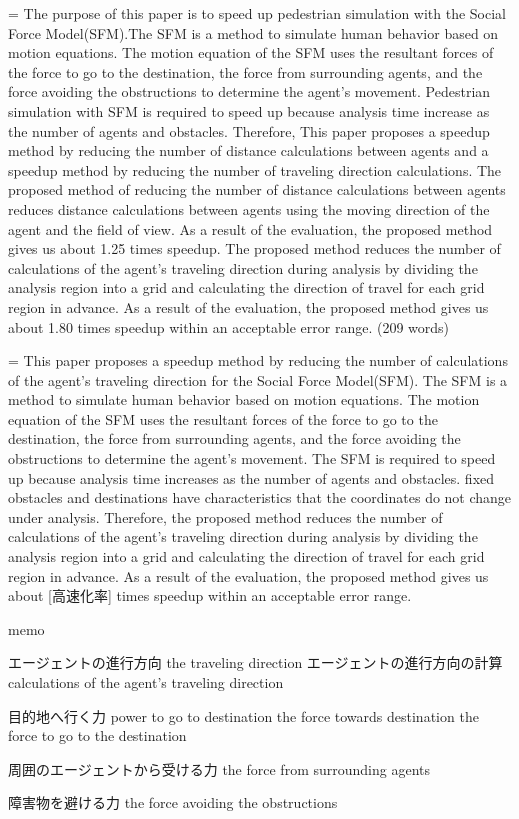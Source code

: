 ={
The purpose of this paper is to speed up pedestrian simulation with the Social Force Model(SFM).The SFM is a method to simulate human behavior based on motion equations. The motion equation of the SFM uses the resultant forces of the force to go to the destination, the force from surrounding agents, and the force avoiding the obstructions to determine the agent’s movement. Pedestrian simulation with SFM is required to speed up because analysis time increase as the number of agents and obstacles. Therefore, This paper proposes a speedup method by reducing the number of distance calculations between agents and a speedup method by reducing the number of traveling direction calculations. The proposed method of reducing the number of distance calculations between agents reduces distance calculations between agents using the moving direction of the agent and the ﬁeld of view. As a result of the evaluation, the proposed method gives us about 1.25 times speedup. The proposed method reduces the number of calculations of the agent’s traveling direction during analysis by dividing the analysis region into a grid and calculating the direction of travel for each grid region in advance. As a result of the evaluation, the proposed method gives us about 1.80 times speedup within an acceptable error range.
(209 words)
}

={
This paper proposes a speedup method by reducing the number of 
calculations of the agent's traveling direction for the Social Force Model(SFM).
The SFM is a method to simulate human behavior based on motion equations.
The motion equation of the SFM uses the resultant forces of the force to go to the destination,
the force from surrounding agents, and the force avoiding the obstructions to determine the agent's
movement.
The SFM is required to speed up because analysis time increases as the number of agents and obstacles.
fixed obstacles and destinations have characteristics that the coordinates do not change under analysis.
Therefore, the proposed method reduces the number of calculations of the agent's traveling direction 
during analysis by dividing the analysis region into a grid and calculating the direction of travel 
for each grid region in advance.
As a result of the evaluation, 
the proposed method gives us about [高速化率] times speedup within an acceptable error range.
}%
\fi

memo

エージェントの進行方向
the traveling direction
エージェントの進行方向の計算
calculations of the agent's traveling direction

目的地へ行く力
power to go to destination
the force towards destination
the force to go to the destination

周囲のエージェントから受ける力
the force from surrounding agents

障害物を避ける力
the force avoiding the obstructions

\fi

